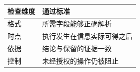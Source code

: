\begin{tabular}{@{}P{4.0cm}P{8.5cm}@{}}
\toprule
\textbf{检查维度} & \textbf{通过标准} \\
\midrule
格式 & 所需字段能够正确解析 \\
时点 & 执行发生在信息实际可得之后 \\
依据 & 结论与保留的证据一致 \\
控制 & 未经授权的操作仍被阻止 \\
\bottomrule
\end{tabular}
